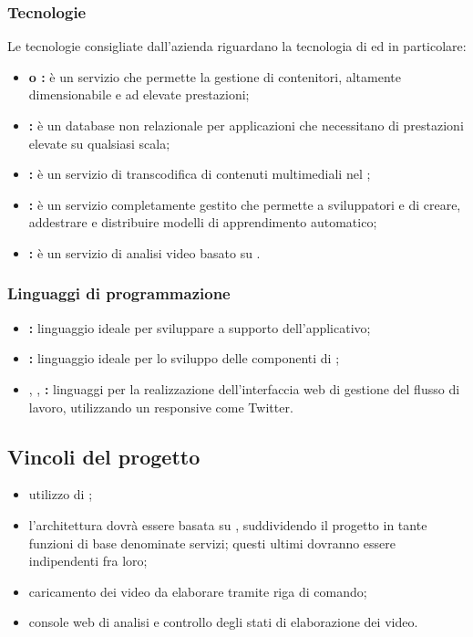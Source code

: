     \subsubsection{Tecnologie}
    Le tecnologie consigliate dall'azienda riguardano la tecnologia di  ed in particolare:
    \begin{itemize}
        \item \textbf{ o : }è un servizio che permette la gestione di contenitori, altamente dimensionabile e ad elevate prestazioni;
        \item \textbf{: }è un database non relazionale per applicazioni che necessitano di prestazioni elevate su qualsiasi scala;
        \item \textbf{: }è un servizio di transcodifica di contenuti multimediali nel ;
        \item \textbf{: }è un servizio completamente gestito che permette a sviluppatori e  di creare, addestrare e distribuire modelli di apprendimento automatico;
        \item \textbf{: }è un servizio di analisi video basato su .
    \end{itemize}
        \subsubsection{Linguaggi di programmazione}
        \begin{itemize}
            \item \textbf{: }linguaggio ideale per sviluppare   a supporto dell'applicativo;
            \item \textbf{: }linguaggio ideale per lo sviluppo delle componenti di ;
            \item \textbf{}, \textbf{}, \textbf{: }linguaggi per la realizzazione dell'interfaccia web di gestione del flusso di lavoro, utilizzando un  responsive come Twitter.
        \end{itemize}
    \subsection{Vincoli del progetto}
    \begin{itemize}
        \item utilizzo di ;
        \item l'architettura dovrà essere basata su , suddividendo il progetto in tante funzioni di base denominate servizi; questi ultimi dovranno essere indipendenti fra loro;
        \item caricamento dei video da elaborare tramite riga di comando;
        \item console web di analisi e controllo degli stati di elaborazione dei video.
      \end{itemize}

